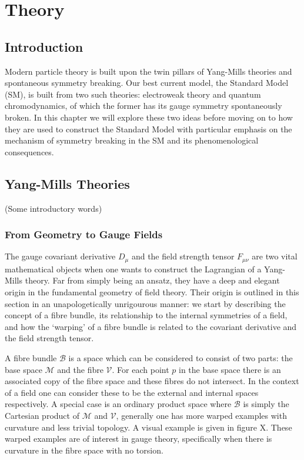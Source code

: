 \chapter{Theory}
\label{chap:theory}

\section{Introduction}
Modern particle theory is built upon the twin pillars of Yang-Mills theories and spontaneous symmetry breaking. 
Our best current model, the Standard Model (SM), is built from two such theories: electroweak theory and quantum chromodynamics, of which the former has its gauge symmetry spontaneously broken. 
In this chapter we will explore these two ideas before moving on to how they are used to construct the Standard Model with particular emphasis on the mechanism of symmetry breaking in the SM and its phenomenological consequences. 







\section{Yang-Mills Theories}
(Some introductory words)

\subsection{From Geometry to Gauge Fields}

The gauge covariant derivative $D_{\mu}$ and the field strength tensor $F_{\mu\nu}$ are two vital mathematical objects when one wants to construct the Lagrangian of a Yang-Mills theory.
Far from simply being an ansatz, they have a deep and elegant origin in the fundamental geometry of field theory. 
Their origin is outlined in this section in an unapologetically unrigourous manner: we start by describing the concept of a fibre bundle, its relationship to the internal symmetries of a field, and how the `warping' of a fibre bundle is related to the covariant derivative and the field strength tensor.


A fibre bundle $\mathcal{B}$ is a space which can be considered to consist of two parts: the base space $\mathcal{M}$ and the fibre $\mathcal{V}$. For each point $p$ in the base space there is an associated copy of the fibre space and these fibres do not intersect. 
In the context of a field one can consider these to be the external and internal spaces respectively. A special case is an ordinary product space where $\mathcal{B}$ is simply the Cartesian product of $\mathcal{M}$ and $\mathcal{V}$, generally one has more warped examples with curvature and less trivial topology. A visual example is given in figure X.
These warped examples are of interest in gauge theory, specifically when there is curvature in the fibre space with no torsion.


